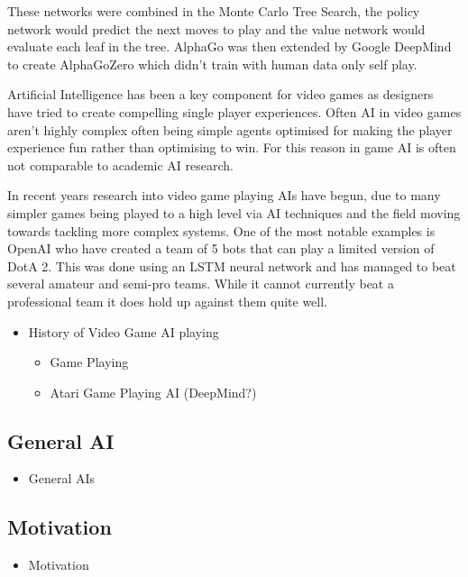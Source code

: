 \documentclass[a4paper]{article}
\begin{document}
These networks were combined in the Monte Carlo Tree Search, the policy network would predict the next moves to play and the value network would evaluate each leaf in the tree.
AlphaGo was then extended by Google DeepMind to create AlphaGoZero which didn't train with human data only self play\cite{alphaGoZero}.
\par
Artificial Intelligence has been a key component for video games as designers have tried to create compelling single player experiences.
Often AI in video games aren't highly complex often being simple agents optimised for making the player experience fun rather than optimising to win.
For this reason in game AI is often not comparable to academic AI research.
\par
In recent years research into video game playing AIs have begun, due to many simpler games being played to a high level via AI techniques and the field moving towards tackling more complex systems.
One of the most notable examples is OpenAI who have created a team of 5 bots that can play a limited version of DotA 2\cite{OpenAIFive}.
This was done using an LSTM neural network and has managed to beat several amateur and semi-pro teams.
While it cannot currently beat a professional team it does hold up against them quite well.

\begin{itemize}
    \item History of Video Game AI playing
    \begin{itemize}
        \item Game Playing
        \item Atari Game Playing AI (DeepMind?)
    \end{itemize}
\end{itemize}
\subsection{General AI}
\begin{itemize}
    \item General AIs
\end{itemize}
\subsection{Motivation}
\begin{itemize}
    \item Motivation
\end{itemize}



%
\end{document}
